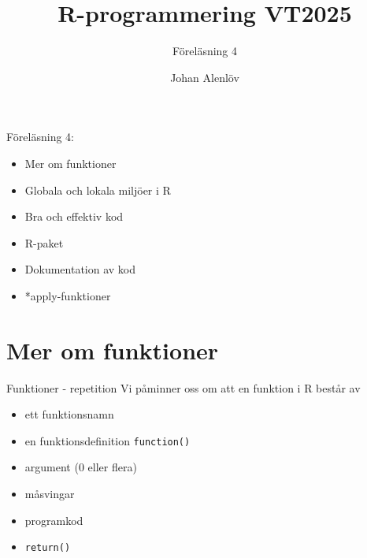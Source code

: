 \documentclass[
  11pt,
  ignorenonframetext,
]{beamer}
\title{R-programmering VT2025}
\subtitle{Föreläsning 4}
\author{Johan Alenlöv}
\date{}
\institute{Linköpings Universitet}
\providecommand{\tightlist}{%
  \setlength{\itemsep}{0pt}\setlength{\parskip}{0pt}}
\begin{document}
\frame{\titlepage}

\begin{frame}{Föreläsning 4:}
\label{fuxf6reluxe4sning-4}
\begin{itemize}
\tightlist
\item
  Mer om funktioner
\item
  Globala och lokala miljöer i R
\item
  Bra och effektiv kod
\item
  R-paket
\item
  Dokumentation av kod
\item
  *apply-funktioner
\end{itemize}
\end{frame}

\section{Mer om funktioner}\label{mer-om-funktioner}

\begin{frame}{Funktioner - repetition}
\label{funktioner---repetition}
Vi påminner oss om att en funktion i R består av

\begin{itemize}
\tightlist
\item
  ett funktionsnamn
\item
  en funktionsdefinition \texttt{function()}
\item
  argument (0 eller flera)
\item
  måsvingar
\item
  programkod
\item
  \texttt{return()}
\end{itemize}
\end{frame}
\end{document}

